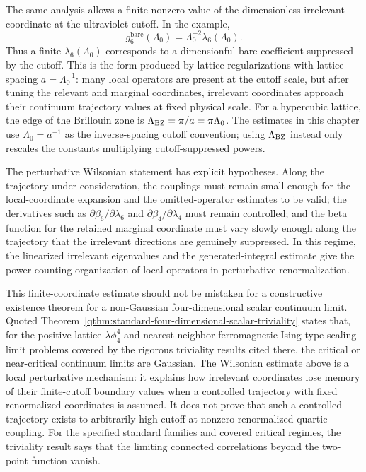 The same analysis allows a finite nonzero value of the dimensionless
irrelevant coordinate at the ultraviolet cutoff.  In the example,
\[
  g_6^{\mathrm{bare}}(\Lambda_0)
  =
  \Lambda_0^{-2}\lambda_6(\Lambda_0).
\]
Thus a finite \(\lambda_6(\Lambda_0)\) corresponds to a dimensionful bare
coefficient suppressed by the cutoff.  This is the form produced by
lattice regularizations with lattice spacing \(a=\Lambda_0^{-1}\): many local
operators are present at the cutoff scale, but after tuning the relevant and
marginal coordinates, irrelevant coordinates approach their continuum
trajectory values at fixed physical scale.
For a hypercubic lattice, the edge of the Brillouin zone is
\(\Lambda_{\rm BZ}=\pi/a=\pi\Lambda_0\).  The estimates in this chapter use
\(\Lambda_0=a^{-1}\) as the inverse-spacing cutoff convention; using
\(\Lambda_{\rm BZ}\) instead only rescales the constants multiplying
cutoff-suppressed powers.

The perturbative Wilsonian statement has explicit hypotheses.  Along the
trajectory under consideration, the couplings must remain small enough for the
local-coordinate expansion and the omitted-operator estimates to be valid; the
derivatives such as \(\partial\beta_6/\partial\lambda_6\) and
\(\partial\beta_4/\partial\lambda_4\) must remain controlled; and the beta
function for the retained marginal coordinate must vary slowly enough along
the trajectory that the irrelevant directions are genuinely suppressed.  In
this regime, the linearized irrelevant eigenvalues and the generated-integral
estimate give the power-counting organization of local operators in
perturbative renormalization.

This finite-coordinate estimate should not be mistaken for a constructive
existence theorem for a non-Gaussian four-dimensional scalar continuum limit.
Quoted Theorem~\ref{qthm:standard-four-dimensional-scalar-triviality} states that,
for the positive lattice \(\lambda\phi^4_4\) and nearest-neighbor
ferromagnetic Ising-type scaling-limit problems covered by the rigorous
triviality results cited there, the critical or near-critical continuum limits
are Gaussian.  The Wilsonian estimate above is a local perturbative
mechanism: it explains how irrelevant coordinates lose memory of their
finite-cutoff boundary values when a controlled trajectory with fixed
renormalized coordinates is assumed.  It does not prove that such a controlled
trajectory exists to arbitrarily high cutoff at nonzero renormalized quartic
coupling.  For the specified standard families and covered critical regimes,
the triviality result says that the limiting connected correlations beyond the
two-point function vanish.

